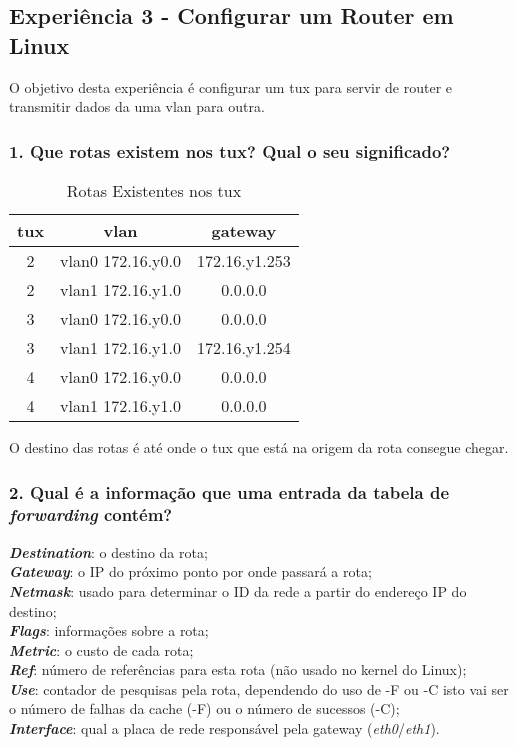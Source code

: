 \subsection*{Experiência 3 - Configurar um Router em Linux}
O objetivo desta experiência é configurar um tux para servir de router e transmitir dados da uma vlan para outra.

\subsubsection{1. Que rotas existem nos tux? Qual o seu significado?}
\begin{table}[ht]
\begin{center}
 	\begin{tabular}{|| c c c||} 
 		\hline
 		tux & vlan & gateway \\ [0.5ex] 
 		\hline\hline
 		2 & vlan0 172.16.y0.0 & 172.16.y1.253\\ 
 		\hline
 		2 & vlan1 172.16.y1.0 & 0.0.0.0\\ 
 		\hline\hline
 		3 & vlan0 172.16.y0.0 & 0.0.0.0\\ 
 		\hline
 		3 & vlan1 172.16.y1.0 & 172.16.y1.254\\ 
 		\hline\hline
 		4 & vlan0 172.16.y0.0 & 0.0.0.0\\ 
 		\hline
 		4 & vlan1 172.16.y1.0 & 0.0.0.0\\ [1ex] 
 		\hline
	\end{tabular}
	\caption{Rotas Existentes nos tux}
	\label{tab:table3}
\end{center}
\end{table}

O destino das rotas é até onde o tux que está na origem da rota consegue chegar.

\subsubsection{2. Qual é a informação que uma entrada da tabela de \emph{forwarding} contém?}
\textbf{\emph{Destination}}: o destino da rota;\\
\textbf{\emph{Gateway}}: o IP do próximo ponto por onde passará a rota;\\
\textbf{\emph{Netmask}}: usado para determinar o ID da rede a partir do endereço IP do destino;\\
\textbf{\emph{Flags}}: informações sobre a rota;\\
\textbf{\emph{Metric}}: o custo de cada rota;\\
\textbf{\emph{Ref}}: número de referências para esta rota (não usado no kernel do Linux);\\
\textbf{\emph{Use}}: contador de pesquisas pela rota, dependendo do uso de -F ou -C isto vai ser o número de falhas da cache (-F) ou o número de sucessos (-C);\\
\textbf{\emph{Interface}}: qual a placa de rede responsável pela gateway (\emph{eth0}/\emph{eth1}).

